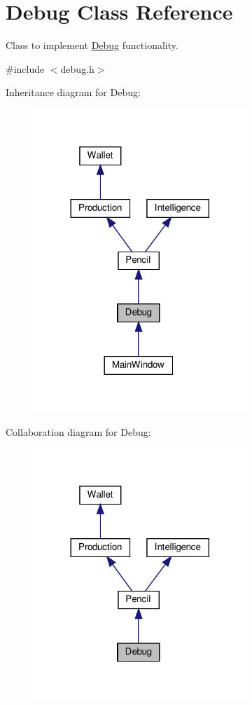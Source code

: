 \hypertarget{classDebug}{}\section{Debug Class Reference}
\label{classDebug}


Class to implement \hyperlink{classDebug}{Debug} functionality.  




{\ttfamily \#include $<$debug.\+h$>$}



Inheritance diagram for Debug\+:\nopagebreak
\begin{figure}[H]
\begin{center}
\leavevmode
\includegraphics[width=228pt]{classDebug__inherit__graph}
\end{center}
\end{figure}


Collaboration diagram for Debug\+:\nopagebreak
\begin{figure}[H]
\begin{center}
\leavevmode
\includegraphics[width=228pt]{classDebug__coll__graph}
\end{center}
\end{figure}
